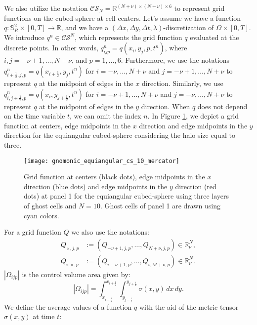 We also utilize the notation $\mathcal{CS}_N=\mathbb{R}^{(N+\nu)\times(N+\nu)\times 6}$
to represent grid functions on the cubed-sphere at cell centers.
Let's assume we have a function $q:\mathbb{S}^2_R\times[0,T] \to \mathbb{R}$, 
and we have a $(\Delta x, \Delta y, \Delta t, \lambda)$-discretization of $\Omega \times [0,T]$.
We introduce $q^n \in \mathcal{CS}^N$, which represents the grid function $q$
evaluated at the discrete points. 
In other words, $q^n_{ijp} = q(x_i,y_j,p,t^n)$, where $i,j=-\nu +1, \ldots, N+\nu$, and $p=1, \ldots, 6$.
Furthermore, we use the notations $q^n_{i+\frac{1}{2},j,p} = q(x_{i+\frac{1}{2}},y_j, t^n)$ 
for $i=-\nu, \ldots, N+\nu$ and $j=-\nu +1, \ldots, N+\nu$ to represent $q$ at the midpoint of edges in
the $x$ direction.
Similarly, we use $q^n_{i,j+\frac{1}{2},p} = q(x_i,y_{j+\frac{1}{2}},t^n)$ for $i=-\nu +1, \ldots, N+\nu$ and $j=-\nu, \ldots, N+\nu$ to represent $q$ at the midpoint of edges in the $y$ direction.
When $q$ does not depend on the time variable $t$, we can omit the index $n$.
In Figure \ref{chp4-cs-grid-function}, we depict a grid function at centers, edge midpoints in the $x$ direction
and edge midpoints in the $y$ direction for the equiangular cubed-sphere considering
the halo size equal to three.
\begin{figure}[!htb]
	\centering
	\texttt{[image: gnomonic\_equiangular\_cs\_10\_mercator]}
	\caption{Grid function at centers (black dots), edge midpoints in the $x$ direction (blue dots)
        and edge midpoints in the $y$ direction (red dots) at panel 1
        for the equiangular cubed-sphere using three layers of ghost cells and $N=10$.
        Ghost cells of panel 1 are drawn using cyan colors.
	\label{chp4-cs-grid-function}}
\end{figure}
For a grid function $Q$ we also use the notations:
\begin{align*}
	Q_{\times,j,p} &:= (Q_{-\nu+1,j,p}, \ldots, Q_{N+\nu,j,p}) \in \mathbb{R}^{N}_{\nu},\\
	Q_{i,\times,p} &:= (Q_{i,-\nu+1,p}, \ldots, Q_{i,M+\nu,p}) \in \mathbb{R}^{N}_{\nu}.
\end{align*}
$|\Omega_{ijp}|$ is the control volume area given by:
\begin{equation}
	\label{chp4-area}
	|\Omega_{ijp}| = \int_{x_{i-\frac{1}{2}}}^{x_{i+\frac{1}{2}}} \int_{y_{j-\frac{1}{2}}}^{y_{j+\frac{1}{2}}}{\sigma(x,y)} \,dx \,dy.
\end{equation}
We define the average values of a function $q$ with the aid of the metric tensor
$\sigma(x,y)$ at time $t$: 
